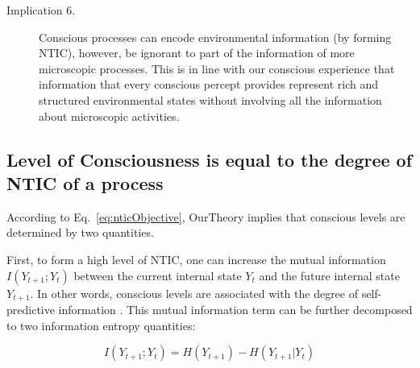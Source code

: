 \documentclass[utf8]{article}
\begin{document}
\begin{description}
            
            \item[Implication 6.]
            Conscious processes can encode environmental information (by forming NTIC), however, be ignorant to part of the information of more microscopic processes. This is in line with our conscious experience that information that every conscious percept provides represent rich and structured environmental states without involving all the information about microscopic activities.
        \end{description}
		
		
	    \subsection{Level of Consciousness is equal to the degree of NTIC of a process}\label{sec:cl}
            According to Eq.~\ref{eq:nticObjective}, \ac{OurTheory} implies that conscious levels are determined by two quantities. 
            
            First, to form a high level of NTIC, one can increase the mutual information $I(Y_{t+1};Y_{t})$ between the current internal state $Y_t$ and the future internal state $Y_{t+1}$. In other words, conscious levels are associated with the degree of self-predictive information \citep{bialek2001predictability}. This mutual information term can be further decomposed to two information entropy quantities: 
            
            \begin{equation}
            \label{eq:SelfEntropy}
            I(Y_{t+1};Y_{t}) = H(Y_{t+1}) - H(Y_{t+1}|Y_t)
            \end{equation}
            
\end{document}
